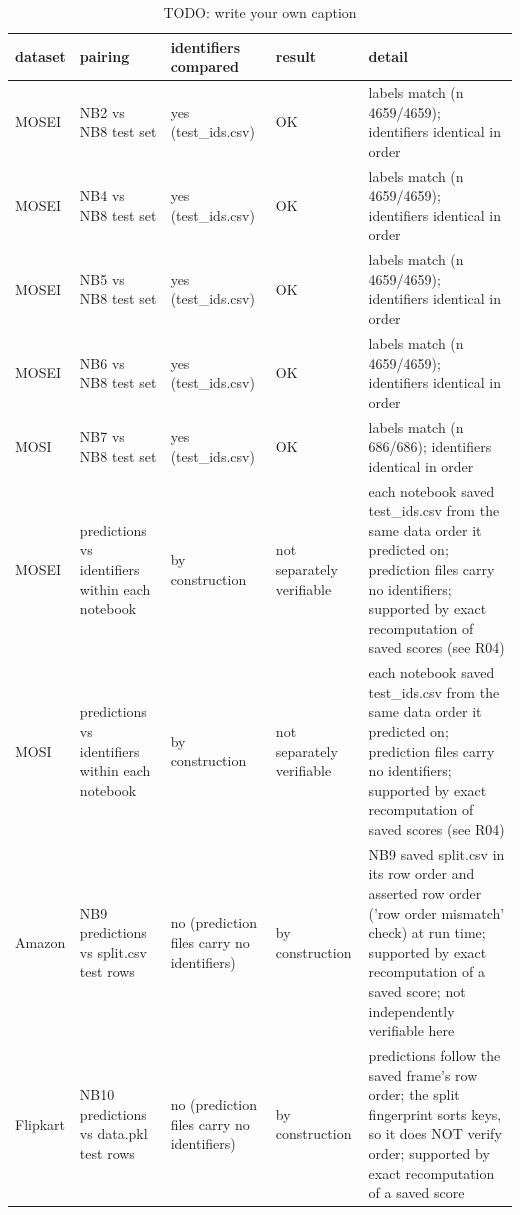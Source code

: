 \begin{table}
\caption{TODO: write your own caption}\label{tab:R05-sample-alignment}
\scriptsize
\begin{tabularx}{\textheight}{l>{\raggedright\arraybackslash}X>{\raggedright\arraybackslash}X>{\raggedright\arraybackslash}X>{\raggedright\arraybackslash}X}
\toprule
dataset & pairing & identifiers compared & result & detail \\
\midrule
MOSEI & NB2 vs NB8 test set & yes (test\_\allowbreak{}ids.csv) & OK & labels match (n 4659/\allowbreak{}4659); identifiers identical in order \\
MOSEI & NB4 vs NB8 test set & yes (test\_\allowbreak{}ids.csv) & OK & labels match (n 4659/\allowbreak{}4659); identifiers identical in order \\
MOSEI & NB5 vs NB8 test set & yes (test\_\allowbreak{}ids.csv) & OK & labels match (n 4659/\allowbreak{}4659); identifiers identical in order \\
MOSEI & NB6 vs NB8 test set & yes (test\_\allowbreak{}ids.csv) & OK & labels match (n 4659/\allowbreak{}4659); identifiers identical in order \\
MOSI & NB7 vs NB8 test set & yes (test\_\allowbreak{}ids.csv) & OK & labels match (n 686/\allowbreak{}686); identifiers identical in order \\
MOSEI & predictions vs identifiers within each notebook & by construction & not separately verifiable & each notebook saved test\_\allowbreak{}ids.csv from the same data order it predicted on; prediction files carry no identifiers; supported by exact recomputation of saved scores (see R04) \\
MOSI & predictions vs identifiers within each notebook & by construction & not separately verifiable & each notebook saved test\_\allowbreak{}ids.csv from the same data order it predicted on; prediction files carry no identifiers; supported by exact recomputation of saved scores (see R04) \\
Amazon & NB9 predictions vs split.csv test rows & no (prediction files carry no identifiers) & by construction & NB9 saved split.csv in its row order and asserted row order ('row order mismatch' check) at run time; supported by exact recomputation of a saved score; not independently verifiable here \\
Flipkart & NB10 predictions vs data.pkl test rows & no (prediction files carry no identifiers) & by construction & predictions follow the saved frame's row order; the split fingerprint sorts keys, so it does NOT verify order; supported by exact recomputation of a saved score \\

\end{tabularx}
\end{table}
